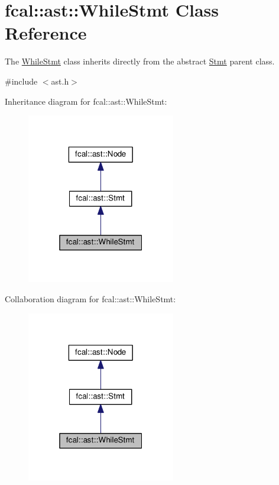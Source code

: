 \hypertarget{classfcal_1_1ast_1_1WhileStmt}{}\section{fcal\+:\+:ast\+:\+:While\+Stmt Class Reference}
\label{classfcal_1_1ast_1_1WhileStmt}


The \hyperlink{classfcal_1_1ast_1_1WhileStmt}{While\+Stmt} class inherits directly from the abstract \hyperlink{classfcal_1_1ast_1_1Stmt}{Stmt} parent class.  




{\ttfamily \#include $<$ast.\+h$>$}



Inheritance diagram for fcal\+:\+:ast\+:\+:While\+Stmt\+:
\nopagebreak
\begin{figure}[H]
\begin{center}
\leavevmode
\includegraphics[width=184pt]{classfcal_1_1ast_1_1WhileStmt__inherit__graph}
\end{center}
\end{figure}


Collaboration diagram for fcal\+:\+:ast\+:\+:While\+Stmt\+:
\nopagebreak
\begin{figure}[H]
\begin{center}
\leavevmode
\includegraphics[width=184pt]{classfcal_1_1ast_1_1WhileStmt__coll__graph}
\end{center}
\end{figure}
